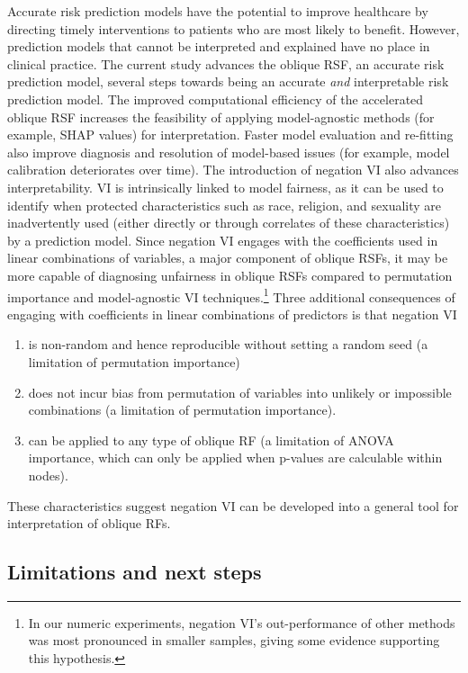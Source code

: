 \documentclass[twoside,11pt]{article}\usepackage[]{graphicx}\usepackage[]{xcolor}
\newcommand{\eg}{for example}
\begin{document}
Accurate risk prediction models have the potential to improve healthcare by directing timely interventions to patients who are most likely to benefit. However, prediction models that cannot be interpreted and explained have no place in clinical practice. The current study advances the oblique RSF, an accurate risk prediction model, several steps towards being an accurate \textit{and} interpretable risk prediction model. The improved computational efficiency of the accelerated oblique RSF increases the feasibility of applying model-agnostic methods (\eg, SHAP values) for interpretation. Faster model evaluation and re-fitting also improve diagnosis and resolution of model-based issues (\eg, model calibration deteriorates over time). The introduction of negation VI also advances interpretability. VI is intrinsically linked to model fairness, as it can be used to identify when protected characteristics such as race, religion, and sexuality are inadvertently used (either directly or through correlates of these characteristics) by a prediction model. Since negation VI  engages with the coefficients used in linear combinations of variables, a major component of oblique RSFs, it may be more capable of diagnosing unfairness in oblique RSFs compared to permutation importance and model-agnostic VI techniques.\footnote{In our numeric experiments, negation VI's out-performance of other methods was most pronounced in smaller samples, giving some evidence supporting this hypothesis.} Three additional consequences of engaging with coefficients in linear combinations of predictors is that negation VI \begin{enumerate}
\item is non-random and hence reproducible without setting a random seed (a limitation of permutation importance)
\item does not incur bias from permutation of variables into unlikely or impossible combinations (a limitation of permutation importance).
\item can be applied to any type of oblique RF (a limitation of ANOVA importance, which can only be applied when p-values are calculable within nodes).
\end{enumerate} These characteristics suggest negation VI can be developed into a general tool for interpretation of oblique RFs.

\subsection{Limitations and next steps}
\end{document}
